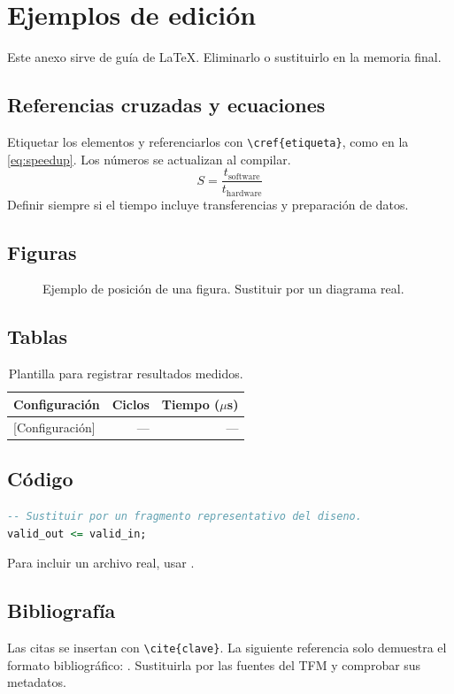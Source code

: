 \chapter{Ejemplos de edición}
\label{app:examples}
Este anexo sirve de guía de LaTeX. Eliminarlo o sustituirlo en la memoria final.
\section{Referencias cruzadas y ecuaciones}
Etiquetar los elementos y referenciarlos con \verb|\cref{etiqueta}|, como en la \cref{eq:speedup}. Los números se actualizan al compilar.
\begin{equation}
 S = \frac{t_{\mathrm{software}}}{t_{\mathrm{hardware}}}
 \label{eq:speedup}
\end{equation}
Definir siempre si el tiempo incluye transferencias y preparación de datos.
\section{Figuras}
\begin{figure}[htbp]
\centering
{}
\caption{Ejemplo de posición de una figura. Sustituir por un diagrama real.}
\label{fig:example}
\end{figure}
\section{Tablas}
\begin{table}[htbp]
\centering
\caption{Plantilla para registrar resultados medidos.}
\label{tab:example}
\begin{tabular}{lrr}
\toprule
Configuración & Ciclos & Tiempo ($\mu$s) \\
\midrule
{[Configuración]} & --- & --- \\
\bottomrule
\end{tabular}
\end{table}
\section{Código}
\begin{lstlisting}[language=VHDL,caption={Ejemplo mínimo de una asignación VHDL.},label={lst:example}]
-- Sustituir por un fragmento representativo del diseno.
valid_out <= valid_in;
\end{lstlisting}
Para incluir un archivo real, usar \verb||.
\section{Bibliografía}
Las citas se insertan con \verb|\cite{clave}|. La siguiente referencia solo demuestra el formato bibliográfico: \cite{latex-companion}. Sustituirla por las fuentes del TFM y comprobar sus metadatos.
